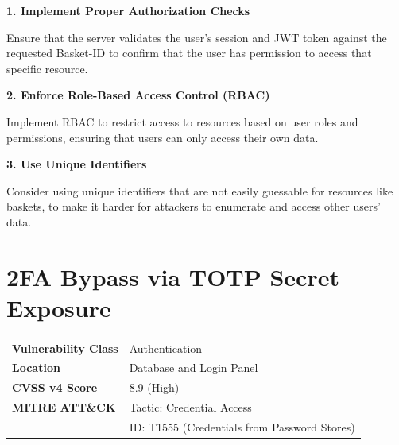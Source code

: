 \documentclass[11pt,a4paper]{report}
\begin{document}
        \begin{tcolorbox}[colback=lightgray,colframe=headerblack,title=\textbf{Recommended Fixes}]
        \textbf{1. Implement Proper Authorization Checks}

        Ensure that the server validates the user's session and JWT token against the requested Basket-ID to confirm that the user has permission to access that specific resource.

        \vspace{0.2cm}

        \textbf{2. Enforce Role-Based Access Control (RBAC)}

        Implement RBAC to restrict access to resources based on user roles and permissions, ensuring that users can only access their own data.

        \vspace{0.2cm}

        \textbf{3. Use Unique Identifiers}

        Consider using unique identifiers that are not easily guessable for resources like baskets, to make it harder for attackers to enumerate and access other users' data.
        \end{tcolorbox}







        \section{ 2FA Bypass via TOTP Secret Exposure}


        \begin{tcolorbox}[colback=lightgray,colframe=headerblack,title=\textbf{Vulnerability Overview}]
        \begin{tabular}{>{\bfseries}p{5cm} p{10cm}}
        Vulnerability Class & Authentication \\

        Location & Database and Login Panel \\

        CVSS v4 Score & 8.9 (High) \\

        MITRE ATT\&CK & Tactic: Credential Access \\
                    & ID: T1555 (Credentials from Password Stores) \\
        \end{tabular}
        \end{tcolorbox}
\end{document}
